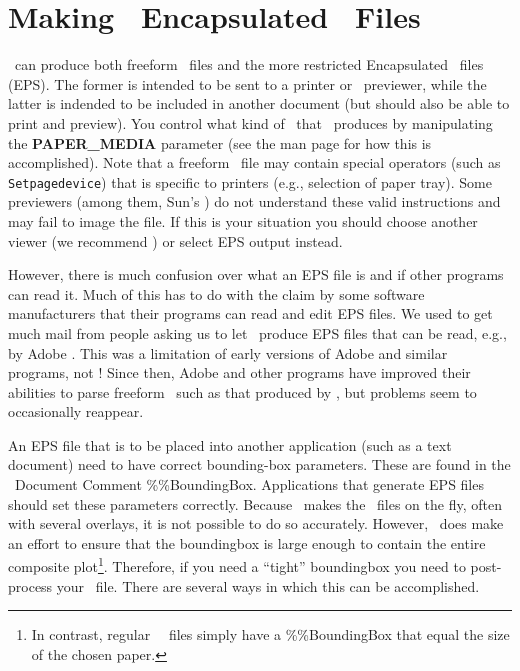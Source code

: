 %
%

\chapter{Making \gmt\ Encapsulated \PS\ Files}
\label{app:C}
\thispagestyle{headings}

\GMT\ can produce both freeform \PS\ files and the more
restricted Encapsulated \PS\ files (EPS).  The former is
intended to be sent to a printer or \PS\ previewer, while
the latter is indended to be included in another document
(but should also be able to print and preview).  You
control what kind of \PS\ that \GMT\ produces by manipulating
the {\bf PAPER\_MEDIA} parameter (see the  man
page for how this is accomplished).  Note that a freeform \PS\
file may contain special operators (such as \texttt{Setpagedevice})
that is specific to printers (e.g., selection of paper tray).
Some previewers (among them, Sun's ) do not
understand these valid instructions and may fail to image the file.
If this is your situation you should choose another viewer (we
recommend ) or select EPS output instead.

However, there is much confusion over what an EPS file is
and if other programs can read it.  Much of this has to do
with the claim by some software manufacturers that their
programs can read and edit EPS files.  We used to get much
mail from people asking us to let \GMT\ produce EPS files
that can be read, e.g., by Adobe .
This was a limitation of early versions of Adobe  and
similar programs, not \GMT!  Since then, Adobe
\progname{Illustrator} and other programs have
improved their abilities to parse freeform \PS\ such as that produced
by \GMT, but problems seem to occasionally reappear.

An EPS file that is to be placed into another application
(such as a text document) need to have correct bounding-box
parameters.  These are found in the \PS\ Document
Comment \%\%BoundingBox.  Applications that generate EPS
files should set these parameters correctly.  Because \GMT\
makes the \PS\ files on the fly, often with several
overlays, it is not possible to do so accurately.  However,
\GMT\ does make an effort to ensure that the boundingbox is
large enough to contain the entire composite plot\footnote{In contrast,
regular \GMT\ \PS\ files simply have
a \%\%BoundingBox that equal the size of the chosen paper.}.
Therefore, if you need a ``tight'' boundingbox you need to post-process
your \PS\ file.  There are several ways in which this
can be accomplished.

